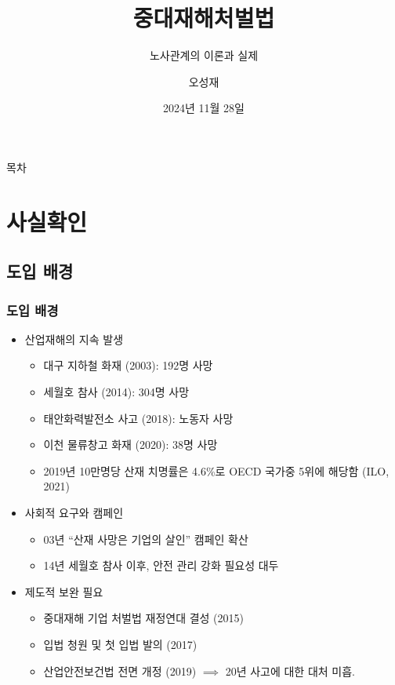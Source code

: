 \documentclass[aspectratio=169,xcolor=dvipsnames,handout]{beamer}
\title{중대재해처벌법}
\subtitle{노사관계의 이론과 실제}
\author{오성재}
\institute[CNU]
{\relax
    충남대학교 경제학과\
    }
\date{2024년 11월 28일}
\begin{document}

\frame{\titlepage}

\begin{frame}{목차}
    \small
    \tableofcontents[hideallsubsections]
\end{frame}

\section{사실확인}%

\subsection{도입 배경}
\begin{frame}[allowframebreaks]
    \frametitle{도입 배경}
    \begin{itemize}
        \item 산업재해의 지속 발생
            \begin{itemize}
                \item 대구 지하철 화재 (2003): 192명 사망
                \item 세월호 참사 (2014): 304명 사망
                \item 태안화력발전소 사고 (2018): 노동자 사망
                \item 이천 물류창고 화재 (2020): 38명 사망
                \item 2019년 10만명당 산재 치명률은 4.6\%로 OECD 국가중 5위에 해당함 (ILO, 2021)
            \end{itemize}
    \framebreak%
        \item 사회적 요구와 캠페인
            \begin{itemize}
                \item 03년 ``산재 사망은 기업의 살인'' 캠페인 확산
                \item 14년 세월호 참사 이후, 안전 관리 강화 필요성 대두
            \end{itemize}
        \item 제도적 보완 필요
            \begin{itemize}
                \item 중대재해 기업 처벌법 재정연대 결성 (2015)
                \item 입법 청원 및 첫 입법 발의 (2017)
                \item 산업안전보건법 전면 개정 (2019) $\implies$ 20년 사고에 대한 대처 미흡.
            \end{itemize}
    \end{itemize}
\end{frame}
\end{document}
